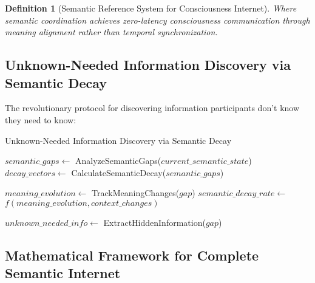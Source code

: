 \documentclass[12pt,a4paper]{article}
\newtheorem{definition}[theorem]{Definition}
\begin{document}
\begin{algorithm}
\begin{algorithmic}[1]
\begin{definition}[Semantic Reference System for Consciousness Internet]
Where semantic coordination achieves zero-latency consciousness communication through meaning alignment rather than temporal synchronization.
\end{definition}

\subsection{Unknown-Needed Information Discovery via Semantic Decay}

The revolutionary protocol for discovering information participants don't know they need to know:

\begin{algorithm}
\caption{Unknown-Needed Information Discovery via Semantic Decay}
\begin{algorithmic}[1]
    \State $semantic\_gaps \leftarrow$ AnalyzeSemanticGaps($current\_semantic\_state$)
    \State $decay\_vectors \leftarrow$ CalculateSemanticDecay($semantic\_gaps$)
    
        \State $meaning\_evolution \leftarrow$ TrackMeaningChanges($gap$)
        \State $semantic\_decay\_rate \leftarrow$ $f(meaning\_evolution, context\_changes)$
        
            \State $unknown\_needed\_info \leftarrow$ ExtractHiddenInformation($gap$)
            \State {}
        \EndIf
    \EndFor
\EndProcedure
\end{algorithmic}
\end{algorithm}

\subsection{Mathematical Framework for Complete Semantic Internet}


\end{algorithmic}
\end{algorithm}
\end{document}
